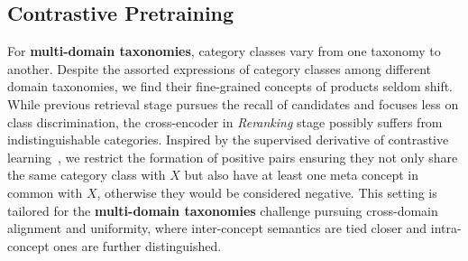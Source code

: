 \subsection{Contrastive Pretraining}
\label{sec:contrastive}

For \textbf{multi-domain taxonomies}, category classes vary from one taxonomy to another. 
Despite the assorted expressions of category classes among different domain taxonomies, we find their fine-grained concepts of products seldom shift. 
While previous retrieval stage pursues the recall of candidates and focuses less on class discrimination, the cross-encoder in \textit{Reranking} stage possibly suffers from indistinguishable categories.
Inspired by the 
supervised derivative of contrastive learning~\cite{wang2021self}, 
we restrict the formation of positive pairs ensuring they not only share the same category class with $X$ but also have at least one meta concept in common with $X$, otherwise they would be considered negative. 
This setting is tailored for the \textbf{multi-domain taxonomies} challenge pursuing cross-domain alignment and uniformity, 
where inter-concept semantics are tied closer and intra-concept ones are further distinguished.

